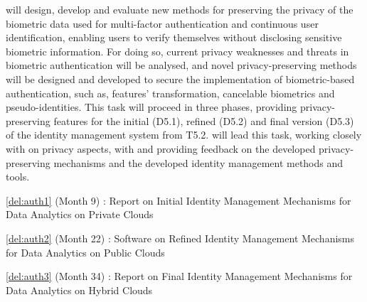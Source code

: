 \begin{Workpackage}{\thewpno}
\begin{Task}
\TaskResults{%
\ref{del:auth1},
\ref{del:auth2},
\ref{del:auth3}
}
\TaskHeader{}
\theTask{} will design, develop and evaluate new methods for preserving the privacy of the biometric data used for multi-factor authentication and continuous user identification, enabling users to verify themselves without disclosing sensitive biometric information. For doing so, current privacy weaknesses and threats in biometric authentication will be analysed, and novel privacy-preserving methods will be designed and developed to secure the implementation of biometric-based authentication, such as, features' transformation, cancelable biometrics and pseudo-identities. This task will proceed in three phases, providing privacy-preserving features for the initial (D5.1), refined (D5.2) and final version (D5.3) of the identity management system from T5.2. \UODshort{} will lead this task, %
working closely with \SCCH on privacy aspects, with \FRQshort{} and \COGNIshort{} providing feedback on the developed privacy-preserving mechanisms and the developed identity management methods and tools.
\end{Task}


\begin{WPDeliverables}
  \begin{compactitem}
  \item \ref{del:auth1} (Month 9) : Report on Initial Identity Management Mechanisms for Data Analytics on Private Clouds
	\item \ref{del:auth2} (Month 22) : Software on Refined Identity Management Mechanisms for Data Analytics on Public Clouds
\item \ref{del:auth3} (Month 34) : Report on Final Identity Management Mechanisms for Data Analytics on Hybrid Clouds
\end{compactitem}
\end{WPDeliverables}
\end{Workpackage}
